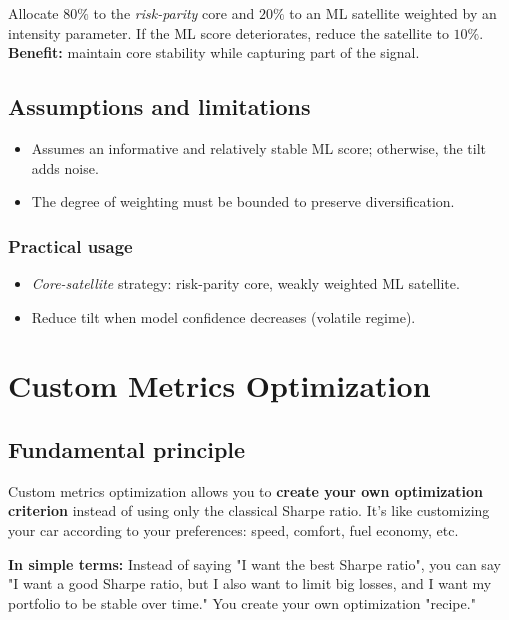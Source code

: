 \documentclass[11pt,a4paper]{article}
\begin{document}
\begin{tcolorbox}[title=Example — Core–Satellite]
Allocate \(80\%\) to the \emph{risk-parity} core and \(20\%\) to an ML satellite weighted by an intensity parameter. If the ML score deteriorates, reduce the satellite to \(10\%\). \textbf{Benefit:} maintain core stability while capturing part of the signal.
\end{tcolorbox}

\subsection{Assumptions and limitations}
\begin{itemize}
  \item Assumes an informative and relatively stable ML score; otherwise, the tilt adds noise.
  \item The degree of weighting must be bounded to preserve diversification.
\end{itemize}

\subsubsection*{Practical usage}
\begin{itemize}
  \item \emph{Core-satellite} strategy: risk-parity core, weakly weighted ML satellite.
  \item Reduce tilt when model confidence decreases (volatile regime).
\end{itemize}

\FloatBarrier
\section{Custom Metrics Optimization}

\subsection{Fundamental principle}
Custom metrics optimization allows you to \textbf{create your own optimization criterion} instead of using only the classical Sharpe ratio. It's like customizing your car according to your preferences: speed, comfort, fuel economy, etc.

\textbf{In simple terms:} Instead of saying "I want the best Sharpe ratio", you can say "I want a good Sharpe ratio, but I also want to limit big losses, and I want my portfolio to be stable over time." You create your own optimization "recipe."
\end{document}
